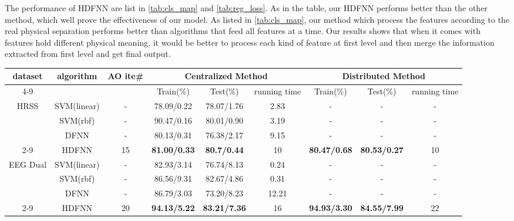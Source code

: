 \documentclass[journal,twocolumn,10pt]{IEEEtran}
\begin{document}
The performance of HDFNN are list in \ref{tab:cls_map} and \ref{tab:reg_loss}. As in the table, our HDFNN performs better than the other method, which well prove the effectiveness of our model. As listed in \ref{tab:cls_map}, our method which process the features according to the real physical separation performs better than algorithms that feed all features at a time. Our results shows that when it comes with features hold different physical meaning, it would be better to process each kind of feature at first level and then merge the information extracted from first level and get final output.  
\begin{table*}[!ht]
  \centering
  {\fontsize{9pt}{10pt}\selectfont
  \vspace{-15pt}
  \caption{Map of classification task}
  \begin{tabular}{|c|c|c|c|c|c|c|c|c|} \hline
  \multirow{2}{*}{dataset} & \multirow{2}{*}{algorithm}  & \multirow{2}{*}{AO ite\#} & \multicolumn{3}{|c|}{Centralized Method} & \multicolumn{3}{|c|}{Distributed Method}    \\ \cline{4-9}
                            &             &      &Train(\%)            & Test(\%)           & running time & Train(\%)          & Test(\%)           & running time  \\ \hline
  \multirow{3}{*}{HRSS}     & SVM(linear) & -    & 78.09/0.22          & 78.07/1.76         & 2.83         & -                  & -                  & -             \\ \cline{2-9}
                            & SVM(rbf)    & -    & 90.47/0.16          & 80.01/0.90         & 3.19         & -                  & -                  & -             \\ \cline{2-9}
                            & DFNN        & -    & 80.13/0.31          & 76.38/2.17         & 9.15         & -                  & -                  & -             \\ \cline{2-9}
                            & HDFNN       & 15   & \textbf{81.00/0.33} & \textbf{80.7/0.44} & 10           & \textbf{80.47/0.68}& \textbf{80.53/0.27}& 10            \\ \hline
  \multirow{3}{*}{EEG Dual} & SVM(linear) & -    & 82.93/3.14          & 76.74/8.13         & 0.24         & -                  & -                  & -             \\ \cline{2-9}
                            & SVM(rbf)    & -    & 86.56/9.31          & 82.67/4.86         & 0.31         & -                  & -                  & -             \\ \cline{2-9}
                            & DFNN        & -    & 86.79/3.03          & 73.20/8.23         & 12.21        & -                  & -                  & -             \\ \cline{2-9}
                            & HDFNN       & 20   & \textbf{94.13/5.22} & \textbf{83.21/7.36}& 16           & \textbf{94.93/3.30}& \textbf{84.55/7.99}& 22            \\ \hline
  \end{tabular}}
  \label{tab:cls_map}
\end{table*}
\end{document}
